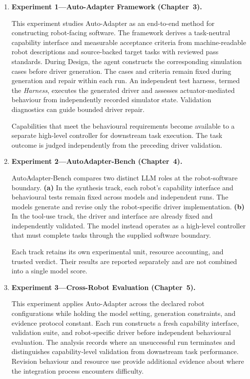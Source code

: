 \begin{enumerate}[leftmargin=*,itemsep=1em]

  \item \textbf{Experiment 1---Auto-Adapter Framework (Chapter~3).}

  This experiment studies Auto-Adapter as an end-to-end method for constructing
  robot-facing software. The framework derives a task-neutral capability
  interface and measurable acceptance criteria from machine-readable robot
  descriptions and source-backed target tasks with reviewed pass standards.
  During Design, the agent constructs the
  corresponding simulation cases before driver generation. The cases and
  criteria remain fixed during generation and repair within each run.
  An independent test harness, termed the \emph{Harness}, executes the
  generated driver and assesses actuator-mediated behaviour from independently
  recorded simulator state. Validation diagnostics can guide bounded driver
  repair.

  Capabilities that meet the behavioural requirements become available to a
  separate high-level controller for downstream task execution. The task
  outcome is judged independently from the preceding driver validation.

  \item \textbf{Experiment 2---AutoAdapter-Bench (Chapter~4).}

  AutoAdapter-Bench compares two distinct LLM roles at the robot-software
  boundary. \textbf{(a)} In the synthesis track, each robot's capability
  interface and behavioural tests remain fixed across models and independent
  runs. The models generate and revise only the robot-specific driver
  implementation. \textbf{(b)} In the tool-use track, the
  driver and interface are already fixed and independently validated. The
  model instead operates as a high-level controller that must complete tasks
  through the supplied software boundary.

  Each track retains its own experimental unit, resource accounting, and
  trusted verdict. Their results are reported separately and are not combined
  into a single model score.

  \item \textbf{Experiment 3---Cross-Robot Evaluation (Chapter~5).}

  This experiment applies Auto-Adapter across the declared robot
  configurations while holding the model setting, generation constraints, and
  evidence protocol constant. Each run constructs a fresh capability interface,
  validation suite, and robot-specific driver before independent behavioural
  evaluation. The analysis records where an unsuccessful run terminates and
  distinguishes capability-level validation from downstream task performance.
  Revision behaviour and resource use provide additional evidence about where
  the integration process encounters difficulty.

\end{enumerate}


